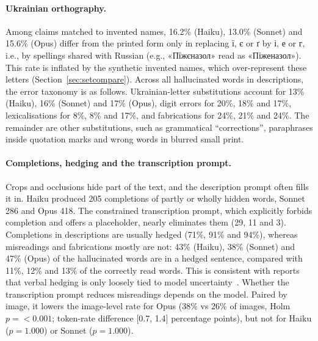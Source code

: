 \documentclass[pdflatex,sn-mathphys-num]{sn-jnl}%
\theoremstyle{thmstyleone}%
\theoremstyle{thmstyletwo}%
\theoremstyle{thmstylethree}%
\newcommand{\ComplHedgedHaiku}{71}
\newcommand{\ComplHedgedOpus}{94}
\newcommand{\ComplHedgedSonnet}{91}
\newcommand{\HedgeCorrHaiku}{11}
\newcommand{\HedgeCorrOpus}{13}
\newcommand{\HedgeCorrSonnet}{12}
\newcommand{\HedgeHallHaiku}{43}
\newcommand{\HedgeHallOpus}{47}
\newcommand{\HedgeHallSonnet}{38}
\newcommand{\NComplHaiku}{205}
\newcommand{\NComplOpus}{418}
\newcommand{\NComplSonnet}{286}
\newcommand{\NComplTransHaiku}{29}
\newcommand{\NComplTransOpus}{3}
\newcommand{\NComplTransSonnet}{11}
\newcommand{\NonceUaHaiku}{16.2}
\newcommand{\NonceUaOpus}{15.6}
\newcommand{\NonceUaSonnet}{13.0}
\newcommand{\SubDigitHaiku}{20}
\newcommand{\SubDigitOpus}{17}
\newcommand{\SubDigitSonnet}{18}
\newcommand{\SubFabHaiku}{24}
\newcommand{\SubFabOpus}{24}
\newcommand{\SubFabSonnet}{21}
\newcommand{\SubLexHaiku}{8}
\newcommand{\SubLexOpus}{17}
\newcommand{\SubLexSonnet}{8}
\newcommand{\SubUaHaiku}{13}
\newcommand{\SubUaOpus}{17}
\newcommand{\SubUaSonnet}{16}
\newcommand{\SynCHaikuDescTransP}{1.000}
\newcommand{\SynCOpusDescTransImg}{38\% vs 26\%}
\newcommand{\SynCOpusDescTransP}{<0.001}
\newcommand{\SynCOpusDescTransTok}{[0.7, 1.4]}
\newcommand{\SynCSonnetDescTransP}{1.000}
\begin{document}
\paragraph{Ukrainian orthography.} Among claims matched to invented names, \NonceUaHaiku\% (Haiku), \NonceUaSonnet\% (Sonnet) and \NonceUaOpus\% (Opus) differ from the printed form only in replacing \foreignlanguage{ukrainian}{ї, є} or \foreignlanguage{ukrainian}{ґ} by \foreignlanguage{ukrainian}{і, е} or \foreignlanguage{ukrainian}{г}, i.e., by spellings shared with Russian (e.g., \foreignlanguage{ukrainian}{«Пїжєназол»} read as \foreignlanguage{ukrainian}{«Піженазол»}). This rate is inflated by the synthetic invented names, which over-represent these letters (Section~\ref{sec:setcompare}). Across all hallucinated words in descriptions, the error taxonomy is as follows. Ukrainian-letter substitutions account for \SubUaHaiku\% (Haiku), \SubUaSonnet\% (Sonnet) and \SubUaOpus\% (Opus), digit errors for \SubDigitHaiku\%, \SubDigitSonnet\% and \SubDigitOpus\%, lexicalisations for \SubLexHaiku\%, \SubLexSonnet\% and \SubLexOpus\%, and fabrications for \SubFabHaiku\%, \SubFabSonnet\% and \SubFabOpus\%. The remainder are other substitutions, such as grammatical ``corrections'', paraphrases inside quotation marks and wrong words in blurred small print.

\paragraph{Completions, hedging and the transcription prompt.}\label{sec:completion} Crops and occlusions hide part of the text, and the description prompt often fills it in. Haiku produced \NComplHaiku{} completions of partly or wholly hidden words, Sonnet \NComplSonnet{} and Opus \NComplOpus{}. The constrained transcription prompt, which explicitly forbids completion and offers a placeholder, nearly eliminates them (\NComplTransHaiku, \NComplTransSonnet{} and \NComplTransOpus). Completions in descriptions are usually hedged (\ComplHedgedHaiku\%, \ComplHedgedSonnet\% and \ComplHedgedOpus\%), whereas misreadings and fabrications mostly are not: \HedgeHallHaiku\% (Haiku), \HedgeHallSonnet\% (Sonnet) and \HedgeHallOpus\% (Opus) of the hallucinated words are in a hedged sentence, compared with \HedgeCorrHaiku\%, \HedgeCorrSonnet\% and \HedgeCorrOpus\% of the correctly read words. This is consistent with reports that verbal hedging is only loosely tied to model uncertainty~\cite{yona2024can}. Whether the transcription prompt reduces misreadings depends on the model. Paired by image, it lowers the image-level rate for Opus (\SynCOpusDescTransImg{} of images, Holm $p=\SynCOpusDescTransP$; token-rate difference \SynCOpusDescTransTok{} percentage points), but not for Haiku ($p=\SynCHaikuDescTransP$) or Sonnet ($p=\SynCSonnetDescTransP$).
\end{document}
